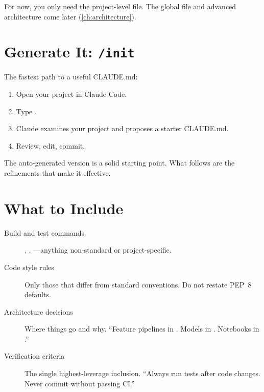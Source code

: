 For now, you only need the project-level file. The global file and
advanced architecture come later (\cref{ch:architecture}).

\section{Generate It: \texttt{/init}}
\label{sec:init}

The fastest path to a useful CLAUDE.md:

\begin{enumerate}
  \item Open your project in Claude Code.
  \item Type .
  \item Claude examines your project and proposes a starter CLAUDE.md.
  \item Review, edit, commit.
\end{enumerate}

The auto-generated version is a solid starting point.
What follows are the refinements that make it effective.

\section{What to Include}
\label{sec:what-to-include}


\begin{description}
  \item[Build and test commands] , ,
    ---anything non-standard or project-specific.
  \item[Code style rules] Only those that differ from standard conventions.
    Do not restate PEP~8 defaults.
  \item[Architecture decisions] Where things go and why.
    ``Feature pipelines in . Models in .
    Notebooks in .''
  \item[Verification criteria] The single highest-leverage inclusion.
    ``Always run tests after code changes. Never commit without passing CI.''
\end{description}

